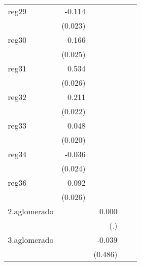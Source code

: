 {\begin{longtable}{l*{4}{D{.}{.}{-1}}}
\addlinespace
reg29       &      -0.114\sym{***}&                     &                     &                     \\
            &     (0.023)         &                     &                     &                     \\
\addlinespace
reg30       &       0.166\sym{***}&                     &                     &                     \\
            &     (0.025)         &                     &                     &                     \\
\addlinespace
reg31       &       0.534\sym{***}&                     &                     &                     \\
            &     (0.026)         &                     &                     &                     \\
\addlinespace
reg32       &       0.211\sym{***}&                     &                     &                     \\
            &     (0.022)         &                     &                     &                     \\
\addlinespace
reg33       &       0.048\sym{*}  &                     &                     &                     \\
            &     (0.020)         &                     &                     &                     \\
\addlinespace
reg34       &      -0.036         &                     &                     &                     \\
            &     (0.024)         &                     &                     &                     \\
\addlinespace
reg36       &      -0.092\sym{***}&                     &                     &                     \\
            &     (0.026)         &                     &                     &                     \\
\addlinespace
2.aglomerado&                     &       0.000         &                     &                     \\
            &                     &         (.)         &                     &                     \\
\addlinespace
3.aglomerado&                     &      -0.039         &                     &                     \\
            &                     &     (0.486)         &                     &                     \\

\end{longtable}}
